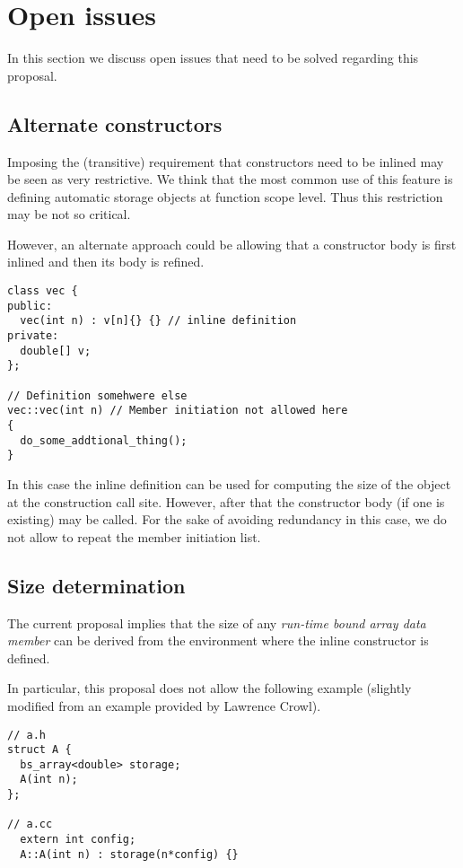 \section{Open issues}

In this section we discuss open issues that need to be solved regarding this proposal.

\subsection{Alternate constructors}

Imposing the (transitive) requirement that constructors need to be inlined may
be seen as very restrictive. We think that the most common use of this feature
is defining automatic storage objects at function scope level. Thus this
restriction may be not so critical.

However, an alternate approach could be allowing that a constructor body is
first inlined and then its body is refined.

\begin{lstlisting}
class vec {
public:
  vec(int n) : v[n]{} {} // inline definition
private:
  double[] v;
};

// Definition somehwere else
vec::vec(int n) // Member initiation not allowed here
{
  do_some_addtional_thing();
}
\end{lstlisting}

In this case the inline definition can be used for computing the size of the
object at the construction call site. However, after that the constructor body
(if one is existing) may be called. For the sake of avoiding redundancy in this
case, we do not allow to repeat the member initiation list.

\subsection{Size determination}

The current proposal implies that the size of any \emph{run-time bound array
data member} can be derived from the environment where the inline constructor is
defined.

In particular, this proposal does not allow the following example (slightly
modified from an example provided by Lawrence Crowl).

\begin{lstlisting}
// a.h
struct A {
  bs_array<double> storage;
  A(int n);
};

// a.cc
  extern int config;
  A::A(int n) : storage(n*config) {}
\end{lstlisting}

